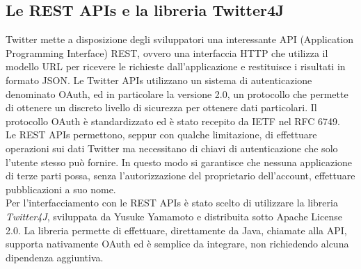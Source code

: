 \subsection{Le REST APIs e la libreria Twitter4J}
Twitter mette a disposizione degli sviluppatori una interessante API (Application Programming Interface) REST, ovvero una interfaccia HTTP che utilizza il modello URL per ricevere le richieste dall'applicazione e restituisce i risultati in formato JSON. Le Twitter APIs utilizzano un sistema di autenticazione denominato OAuth, ed in particolare la versione 2.0, un protocollo che permette di ottenere un discreto livello di sicurezza per ottenere dati particolari. Il protocollo OAuth è standardizzato ed è stato recepito da IETF nel RFC 6749.
\\Le REST APIs permettono, seppur con qualche limitazione, di effettuare operazioni sui dati Twitter ma necessitano di chiavi di autenticazione che solo l'utente stesso può fornire. In questo modo si garantisce che nessuna applicazione di terze parti possa, senza l'autorizzazione del proprietario dell'account, effettuare pubblicazioni a suo nome.
\\Per l'interfacciamento con le REST APIs è stato scelto di utilizzare la libreria \textit{Twitter4J}, sviluppata da Yusuke Yamamoto e distribuita sotto Apache License 2.0. La libreria permette di effettuare, direttamente da Java, chiamate alla API, supporta nativamente OAuth ed è semplice da integrare, non richiedendo alcuna dipendenza aggiuntiva.

